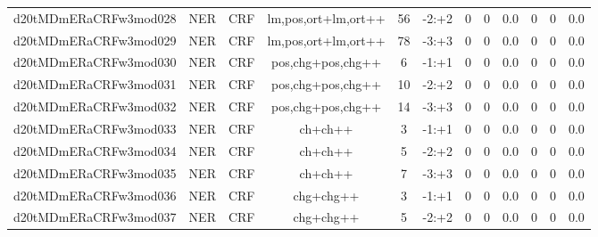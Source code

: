 \documentclass[a4paper]{article}
\begin{document}
\begin{landscape}
\begin{center}
\begin{tabular}{ |c|c|c|c|c|c|c|c|c|c|c|c|}
 	

 
 	
 	\small{ d20tMDmERaCRFw3mod028 } & \small{ NER} & \small{  CRF }  & lm,pos,ort+lm,ort++  &  56 &  \small{  -2:+2 }  &  0 & 0 & 0.0  &  0 & 0 & 0.0 \\
 	

 
 	
 	\small{ d20tMDmERaCRFw3mod029 } & \small{ NER} & \small{  CRF }  & lm,pos,ort+lm,ort++  &  78 &  \small{  -3:+3 }  &  0 & 0 & 0.0  &  0 & 0 & 0.0 \\
 	

 
 	
 	\small{ d20tMDmERaCRFw3mod030 } & \small{ NER} & \small{  CRF }  & pos,chg+pos,chg++  &  6 &  \small{  -1:+1 }  &  0 & 0 & 0.0  &  0 & 0 & 0.0 \\
 	

 
 	
 	\small{ d20tMDmERaCRFw3mod031 } & \small{ NER} & \small{  CRF }  & pos,chg+pos,chg++  &  10 &  \small{  -2:+2 }  &  0 & 0 & 0.0  &  0 & 0 & 0.0 \\
 	

 
 	
 	\small{ d20tMDmERaCRFw3mod032 } & \small{ NER} & \small{  CRF }  & pos,chg+pos,chg++  &  14 &  \small{  -3:+3 }  &  0 & 0 & 0.0  &  0 & 0 & 0.0 \\
 	

 
 	
 	\small{ d20tMDmERaCRFw3mod033 } & \small{ NER} & \small{  CRF }  & ch+ch++  &  3 &  \small{  -1:+1 }  &  0 & 0 & 0.0  &  0 & 0 & 0.0 \\
 	

 
 	
 	\small{ d20tMDmERaCRFw3mod034 } & \small{ NER} & \small{  CRF }  & ch+ch++  &  5 &  \small{  -2:+2 }  &  0 & 0 & 0.0  &  0 & 0 & 0.0 \\
 	

 
 	
 	\small{ d20tMDmERaCRFw3mod035 } & \small{ NER} & \small{  CRF }  & ch+ch++  &  7 &  \small{  -3:+3 }  &  0 & 0 & 0.0  &  0 & 0 & 0.0 \\
 	

 
 	
 	\small{ d20tMDmERaCRFw3mod036 } & \small{ NER} & \small{  CRF }  & chg+chg++  &  3 &  \small{  -1:+1 }  &  0 & 0 & 0.0  &  0 & 0 & 0.0 \\
 	

 
 	
 	\small{ d20tMDmERaCRFw3mod037 } & \small{ NER} & \small{  CRF }  & chg+chg++  &  5 &  \small{  -2:+2 }  &  0 & 0 & 0.0  &  0 & 0 & 0.0 \\
 	


\end{tabular}
\end{center}
\end{landscape}
\end{document}

